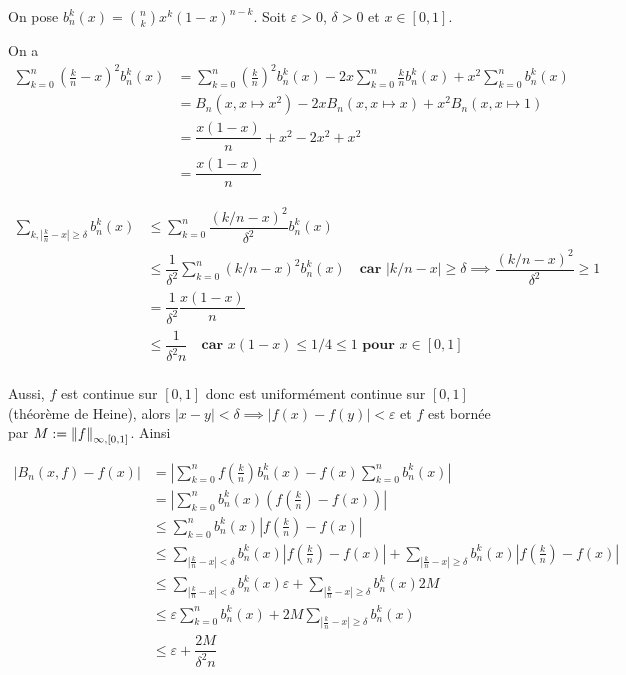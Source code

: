 \documentclass[a4paper, 12pt]{article}
\begin{document}
\begin{demonstration}
    On pose $b_n^k(x) = \binom{n}{k} x^k (1-x)^{n-k}$.
    Soit $\varepsilon > 0$, $\delta > 0$ et $x \in [0, 1]$.

    On a
    \begin{align*}
        \sum_{k=0}^n \left(\frac{k}{n} - x \right)^2 b_n^k(x) &= \sum_{k=0}^n \left(\frac{k}{n}\right)^2 b_n^k(x) - 2x \sum_{k=0}^n \frac{k}{n} b_n^k(x) + x^2 \sum_{k=0}^n b_n^k(x) \\
        &= B_n(x, x \mapsto x^2) - 2x B_n(x, x \mapsto x) + x^2 B_n(x, x \mapsto 1) \\
        &= \dfrac{x(1-x)}{n} + x^2 - 2x^2 + x^2 \\
        &= \dfrac{x(1-x)}{n}
    \end{align*}

    \begin{align*}
        \sum_{k, |\frac{k}{n} - x| \geq \delta} b_n^k(x) &\leq \sum_{k=0}^n \dfrac{(k/n - x)^2}{\delta^2} b_n^k(x) \\
        &\leq \dfrac{1}{\delta^2} \sum_{k=0}^n (k/n - x)^2 b_n^k(x) \quad \textbf{car $|k/n - x| \geq \delta \implies \dfrac{(k/n - x)^2}{\delta^2} \geq 1$}\\
        &= \dfrac{1}{\delta^2} \dfrac{x(1-x)}{n} \\
        &\leq \dfrac{1}{\delta^2 n} \quad \textbf{car $x(1-x) \leq 1/4 \leq 1$ pour $x \in [0, 1]$} \\
    \end{align*}

    Aussi, $f$ est continue sur $[0, 1]$ donc est uniformément continue sur $[0, 1]$ (théorème de Heine), alors $|x - y| < \delta \implies |f(x) - f(y)| < \varepsilon$ et $f$ est bornée par $M := \left\lVert f\right\rVert_{\infty, [0, 1]}$.
    Ainsi

    \begin{align*}
        |B_n(x, f) - f(x)| &= \left| \sum_{k=0}^n f\left( \frac{k}{n} \right) b_n^k(x) - f(x) \sum_{k=0}^n b_n^k(x) \right| \\
        &= \left| \sum_{k=0}^n b_n^k(x) \left( f\left( \frac{k}{n} \right) - f(x) \right) \right| \\
        &\leq \sum_{k=0}^n b_n^k(x) \left| f\left( \frac{k}{n} \right) - f(x) \right| \\
        &\leq \sum_{|\frac{k}{n} - x| < \delta} b_n^k(x) \left| f\left( \frac{k}{n} \right) - f(x) \right| + \sum_{|\frac{k}{n} - x| \geq \delta} b_n^k(x) \left| f\left( \frac{k}{n} \right) - f(x) \right| \\
        &\leq \sum_{|\frac{k}{n} - x| < \delta} b_n^k(x) \varepsilon + \sum_{|\frac{k}{n} - x| \geq \delta} b_n^k(x) 2M \\
        &\leq \varepsilon \sum_{k=0}^n b_n^k(x) + 2M \sum_{|\frac{k}{n} - x| \geq \delta} b_n^k(x) \\
        &\leq \varepsilon + \dfrac{2M}{\delta^2 n} \
    \end{align*}


\end{demonstration}
\end{document}
